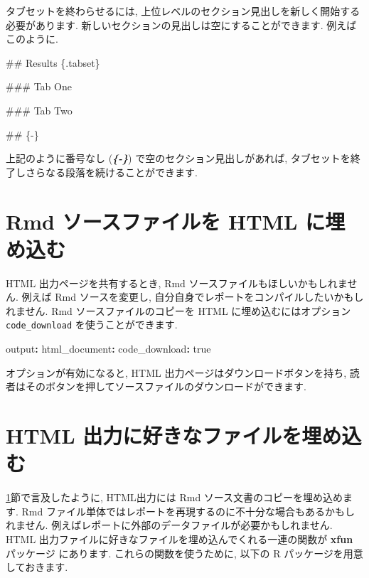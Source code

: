 \documentclass[
  11pt,
]{bxjsreport}
\newenvironment{Shaded}{\begin{snugshade}}{\end{snugshade}}
\newcommand{\AttributeTok}[1]{\textcolor[rgb]{0.77,0.63,0.00}{#1}}
\newcommand{\CharTok}[1]{\textcolor[rgb]{0.31,0.60,0.02}{#1}}
\newcommand{\FunctionTok}[1]{\textcolor[rgb]{0.00,0.00,0.00}{#1}}
\newcommand{\InformationTok}[1]{\textcolor[rgb]{0.56,0.35,0.01}{\textbf{\textit{#1}}}}
\newcommand{\KeywordTok}[1]{\textcolor[rgb]{0.13,0.29,0.53}{\textbf{#1}}}
\newcommand{\NormalTok}[1]{#1}
\begin{document}
タブセットを終わらせるには, 上位レベルのセクション見出しを新しく開始する必要があります. 新しいセクションの見出しは空にすることができます. 例えばこのように.

\begin{Shaded}
\begin{Highlighting}[]
\FunctionTok{\#\# Results \{.tabset\}}

\FunctionTok{\#\#\# Tab One}

\FunctionTok{\#\#\# Tab Two}

\FunctionTok{\#\# \{{-}\}}

\NormalTok{上記のように番号なし (}\InformationTok{\textasciigrave{}\{{-}\}\textasciigrave{}}\NormalTok{) で空のセクション見出しがあれば,}
\NormalTok{タブセットを終了しさらなる段落を続けることができます.}
\end{Highlighting}
\end{Shaded}

\hypertarget{embed-rmd}{%
\section{Rmd ソースファイルを HTML に埋め込む}\label{embed-rmd}}

HTML 出力ページを共有するとき, Rmd ソースファイルもほしいかもしれません. 例えば Rmd ソースを変更し, 自分自身でレポートをコンパイルしたいかもしれません. Rmd ソースファイルのコピーを HTML に埋め込むにはオプション \texttt{code\_download} を使うことができます.

\begin{Shaded}
\begin{Highlighting}[]
\FunctionTok{output}\KeywordTok{:}
\AttributeTok{  }\FunctionTok{html\_document}\KeywordTok{:}
\AttributeTok{    }\FunctionTok{code\_download}\KeywordTok{:}\AttributeTok{ }\CharTok{true}
\end{Highlighting}
\end{Shaded}

オプションが有効になると, HTML 出力ページはダウンロードボタンを持ち, 読者はそのボタンを押してソースファイルのダウンロードができます.

\hypertarget{embed-file}{%
\section{HTML 出力に好きなファイルを埋め込む}\label{embed-file}}

\ref{embed-rmd}節で言及したように, HTML出力には Rmd ソース文書のコピーを埋め込めます. Rmd ファイル単体ではレポートを再現するのに不十分な場合もあるかもしれません. 例えばレポートに外部のデータファイルが必要かもしれません. HTML 出力ファイルに好きなファイルを埋め込んでくれる一連の関数が \textbf{xfun} パッケージ \autocite{R-xfun} にあります. これらの関数を使うために, 以下の R パッケージを用意しておきます.
\end{document}
